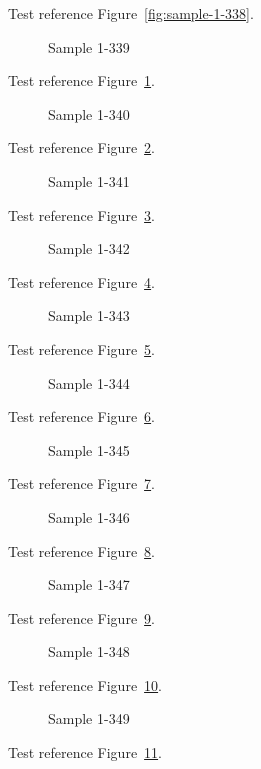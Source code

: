 Test reference Figure~\ref{fig:sample-1-338}.

\begin{figure}[tbhp]
\caption{Sample 1-339}
\label{fig:sample-1-339}
\end{figure}

Test reference Figure~\ref{fig:sample-1-339}.

\begin{figure}[tbhp]
\caption{Sample 1-340}
\label{fig:sample-1-340}
\end{figure}

Test reference Figure~\ref{fig:sample-1-340}.

\begin{figure}[tbhp]
\caption{Sample 1-341}
\label{fig:sample-1-341}
\end{figure}

Test reference Figure~\ref{fig:sample-1-341}.

\begin{figure}[tbhp]
\caption{Sample 1-342}
\label{fig:sample-1-342}
\end{figure}

Test reference Figure~\ref{fig:sample-1-342}.

\begin{figure}[tbhp]
\caption{Sample 1-343}
\label{fig:sample-1-343}
\end{figure}

Test reference Figure~\ref{fig:sample-1-343}.

\begin{figure}[tbhp]
\caption{Sample 1-344}
\label{fig:sample-1-344}
\end{figure}

Test reference Figure~\ref{fig:sample-1-344}.

\begin{figure}[tbhp]
\caption{Sample 1-345}
\label{fig:sample-1-345}
\end{figure}

Test reference Figure~\ref{fig:sample-1-345}.

\begin{figure}[tbhp]
\caption{Sample 1-346}
\label{fig:sample-1-346}
\end{figure}

Test reference Figure~\ref{fig:sample-1-346}.

\begin{figure}[tbhp]
\caption{Sample 1-347}
\label{fig:sample-1-347}
\end{figure}

Test reference Figure~\ref{fig:sample-1-347}.

\begin{figure}[tbhp]
\caption{Sample 1-348}
\label{fig:sample-1-348}
\end{figure}

Test reference Figure~\ref{fig:sample-1-348}.

\begin{figure}[tbhp]
\caption{Sample 1-349}
\label{fig:sample-1-349}
\end{figure}

Test reference Figure~\ref{fig:sample-1-349}.


